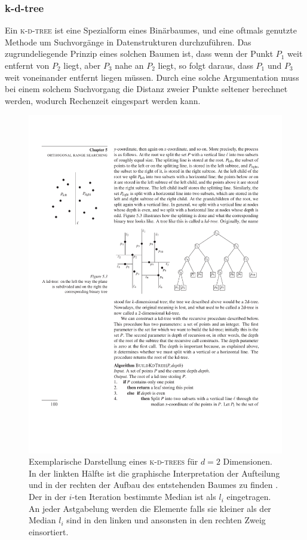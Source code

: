 \subsubsection{k-d-tree}
Ein \textsc{k-d-tree} ist eine Spezialform eines Binärbaumes, und eine oftmals genutzte Methode um Suchvorgänge in Datenstrukturen durchzuführen. Das zugrundeliegende Prinzip eines solchen Baumen ist, dass wenn der Punkt $P_1$ weit entfernt von $P_2$ liegt, aber $P_3$ nahe an $P_2$ liegt, so folgt daraus, dass $P_1$ und $P_3$ weit voneinander entfernt liegen müssen. Durch eine solche Argumentation muss bei einem solchem Suchvorgang die Distanz zweier Punkte seltener berechnet werden, wodurch Rechenzeit eingespart werden kann.\\

\begin{figure}[h]
    \centering
    \includegraphics[width = 0.9 \textwidth]{figures/illustrations/kdtree.pdf}
    \caption{Exemplarische Darstellung eines \textsc{k-d-trees} für $d=2$ Dimensionen. In der linkten Hälfte ist die graphische Interpretation der Aufteilung und in der rechten der Aufbau des entstehenden Baumes zu finden \cite{de2000computational}. Der in der $i$-ten Iteration bestimmte Median ist als $l_i$ eingetragen. An jeder Astgabelung werden die Elemente falls sie kleiner als der Median $l_i$ sind in den linken und ansonsten in den rechten Zweig einsortiert.}
    \label{fig:kdtree}
\end{figure}

